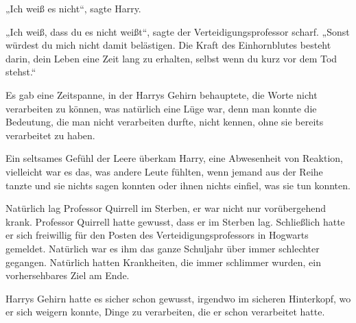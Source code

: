 „Ich weiß es nicht“, sagte Harry.

„Ich weiß, dass du es nicht weißt“, sagte der Verteidigungsprofessor scharf. „Sonst würdest du mich nicht damit belästigen. Die Kraft des Einhornblutes besteht darin, dein Leben eine Zeit lang zu erhalten, selbst wenn du kurz vor dem Tod stehst.“

Es gab eine Zeitspanne, in der Harrys Gehirn behauptete, die Worte nicht verarbeiten zu können, was natürlich eine Lüge war, denn man konnte die Bedeutung, die man nicht verarbeiten durfte, nicht kennen, ohne sie bereits verarbeitet zu haben.

Ein seltsames Gefühl der Leere überkam Harry, eine Abwesenheit von Reaktion, vielleicht war es das, was andere Leute fühlten, wenn jemand aus der Reihe tanzte und sie nichts sagen konnten oder ihnen nichts einfiel, was sie tun konnten.

Natürlich lag Professor Quirrell im Sterben, er war nicht nur vorübergehend krank. Professor Quirrell hatte gewusst, dass er im Sterben lag. Schließlich hatte er sich freiwillig für den Posten des Verteidigungsprofessors in Hogwarts gemeldet. Natürlich war es ihm das ganze Schuljahr über immer schlechter gegangen. Natürlich hatten Krankheiten, die immer schlimmer wurden, ein vorhersehbares Ziel am Ende.

Harrys Gehirn hatte es sicher schon gewusst, irgendwo im sicheren Hinterkopf, wo er sich weigern konnte, Dinge zu verarbeiten, die er schon verarbeitet hatte.

